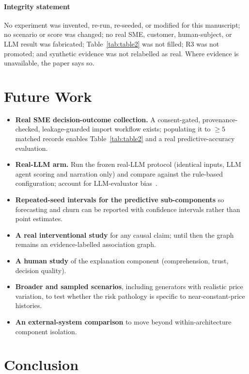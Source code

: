 \documentclass[conference]{IEEEtran}
\begin{document}
\paragraph{Integrity statement}
No experiment was invented, re-run, re-seeded, or modified for this manuscript;
no scenario or score was changed; no real SME, customer, human-subject, or LLM
result was fabricated; Table~\ref{tab:table2} was not filled; R3 was not
promoted; and synthetic evidence was not relabelled as real. Where evidence is
unavailable, the paper says so.

\section{Future Work}
\label{sec:future}

\begin{itemize}
\item \textbf{Real SME decision-outcome collection.} A consent-gated,
provenance-checked, leakage-guarded import workflow exists; populating it to
$\geq 5$ matched records enables Table~\ref{tab:table2} and a real
predictive-accuracy evaluation.
\item \textbf{Real-LLM arm.} Run the frozen real-LLM protocol (identical inputs,
LLM agent scoring and narration only) and compare against the rule-based
configuration; account for LLM-evaluator bias~\cite{Zheng2023}.
\item \textbf{Repeated-seed intervals for the predictive sub-components} so
forecasting and churn can be reported with confidence intervals rather than
point estimates.
\item \textbf{A real interventional study} for any causal claim; until then the
graph remains an evidence-labelled association graph.
\item \textbf{A human study} of the explanation component (comprehension, trust,
decision quality).
\item \textbf{Broader and sampled scenarios}, including generators with
realistic price variation, to test whether the risk pathology is specific to
near-constant-price histories.
\item \textbf{An external-system comparison} to move beyond within-architecture
component isolation.
\end{itemize}

\section{Conclusion}
\label{sec:conclusion}
\end{document}
